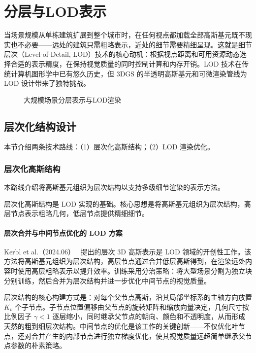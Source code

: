 \section{分层与LOD表示}
\label{sec:14_3}

当场景规模从单栋建筑扩展到整个城市时，在任何视点都加载全部高斯基元既不现实也不必要——远处的建筑只需粗略表示，近处的细节需要精细呈现。这就是细节层次（Level-of-Detail, LOD）技术的核心动机：根据视点距离和可用资源动态选择合适的表示精度，在保持视觉质量的同时控制计算和内存开销。LOD 技术在传统计算机图形学中已有悠久历史，但 3DGS 的半透明高斯基元和可微渲染管线为 LOD 设计带来了独特挑战。

\begin{figure}[htbp]
\centering
\resizebox{!}{0.4\textheight}{}
\caption{大规模场景分层表示与LOD渲染}
\label{fig:ch14_scale_hierarchy}
\end{figure}

\subsection{层次化结构设计}
\label{ss:14_5}

本节介绍两条技术路线：（1）层次化高斯结构；（2）LOD 渲染优化。

\subsubsection{层次化高斯结构}

本路线介绍将高斯基元组织为层次结构以支持多级细节渲染的表示方法。

层次化高斯结构是 LOD 实现的基础。核心思想是将高斯基元组织为层次结构，高层节点表示粗略几何，低层节点提供精细细节。

\paragraph{层次合并与中间节点优化的 LOD 方案}

Kerbl et al.（2024.06）~\cite{2406_12080} 提出的层次 3D 高斯表示是 LOD 领域的开创性工作。该方法将高斯基元组织为层次结构，高层节点通过合并低层高斯得到，在渲染远处内容时使用高层粗略表示以提升效率。训练采用分治策略：将大型场景分割为独立块分别训练，然后合并为层次结构并进一步优化中间节点的视觉质量。

层次结构的核心构建方式是：对每个父节点高斯，沿其局部坐标系的主轴方向放置 $K_v$ 个子节点。子节点位置偏移由父节点的旋转矩阵和缩放向量决定，几何尺寸按比例因子 $\gamma < 1$ 逐层缩小，同时继承父节点的朝向、颜色和不透明度，从而形成天然的粗到细层次结构。中间节点的优化是该工作的关键创新——不仅优化叶节点，还对合并产生的内部节点进行独立梯度优化，使其视觉质量远超简单继承父节点参数的朴素策略。

